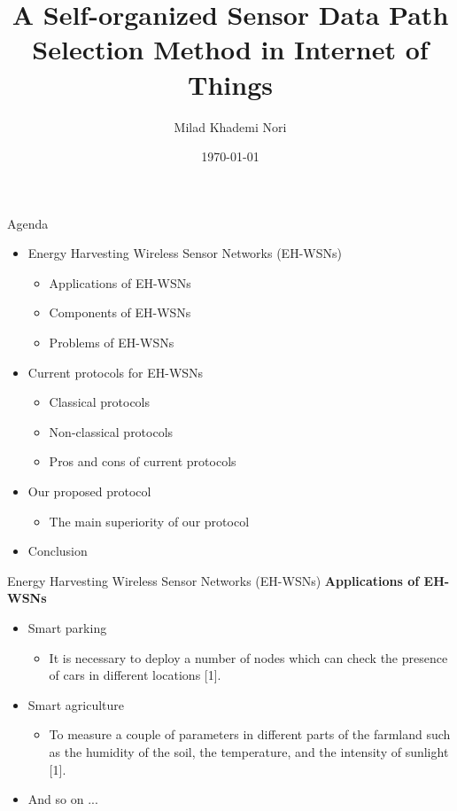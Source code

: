 \documentclass{beamer}
\title[Reinforcement Learning]{A Self-organized Sensor Data Path Selection Method in Internet of Things}
\author{Milad Khademi Nori}
\institute{Amirkabir University of Technology}
\date{\today}
\begin{document}
\begin{frame}
\titlepage
\end{frame}


\begin{frame}[t]{Agenda} %
\begin{itemize}
\item Energy Harvesting Wireless Sensor Networks (EH-WSNs)
		\begin{itemize}
		\item Applications of EH-WSNs 
		\item Components of EH-WSNs
		\item Problems of EH-WSNs
		\end{itemize}		
\item Current protocols for EH-WSNs
		\begin{itemize}		
		\item Classical protocols
		\item Non-classical protocols
		\item Pros and cons of current protocols
		\end{itemize}		
\item Our proposed protocol
		\begin{itemize}
		\item The main superiority of our protocol
		\end{itemize}
\item Conclusion
\end{itemize}
\end{frame}


\begin{frame}[t]{Energy Harvesting Wireless Sensor Networks (EH-WSNs)} %
\textbf{Applications of EH-WSNs}
\begin{itemize}
\item Smart parking
	\begin{itemize}
	\justifying
	\item It is necessary to deploy a number of nodes which can check the presence of cars in different locations [1].
	\end{itemize}
\item Smart agriculture
	\begin{itemize}
	\justifying
	\item To measure a couple of parameters in different parts of the farmland such as the humidity of the soil, the temperature, and the intensity of sunlight [1].
	\end{itemize}
\item And so on ...
\end{itemize}
\end{frame}
\end{document}
